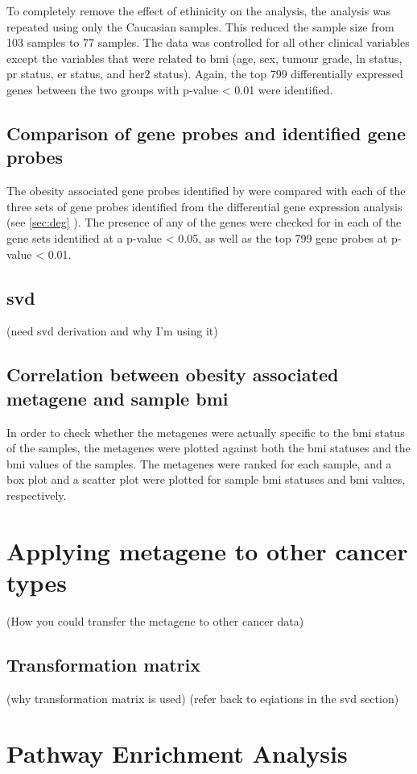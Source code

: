 To completely remove the effect of ethinicity on the analysis, the analysis was repeated using only the Caucasian samples.
This reduced the sample size from 103 samples to 77 samples.
The data was controlled for all other clinical variables except the variables that were related to \gls{bmi} (age, sex, tumour grade, \gls{ln} status, \gls{pr} status, \gls{er} status, and \gls{her2} status).
Again, the top 799 differentially expressed genes between the two groups with p-value \textless{} 0.01 were identified.

\subsection{Comparison of \citet{Creighton2012} gene probes and identified gene probes}
\label{subsec:cfgeneprobes}

The obesity associated gene probes identified by \citet{Creighton2012} were compared with each of the three sets of gene probes identified from the differential gene expression analysis (see \cref{sec:deg} ).
The presence of any of the \citet{Creighton2012} genes were checked for in each of the gene sets identified at a p-value \textless{} 0.05, as well as the top 799 gene probes at p-value \textless{} 0.01.

\subsection{\gls{svd}}
\label{subsec:svd}

(need svd derivation and why I'm using it)

\subsection{Correlation between obesity associated metagene and sample \gls{bmi}}
\label{subsec:metavsbmi}

In order to check whether the metagenes were actually specific to the \gls{bmi} status of the samples, the metagenes were plotted against both the \gls{bmi} statuses and the \gls{bmi} values of the samples.
The metagenes were ranked for each sample, and a box plot and a scatter plot were plotted for sample \gls{bmi} statuses and \gls{bmi} values, respectively.

\section{Applying metagene to other cancer types}
\label{sec:metagene}

(How you could transfer the metagene to other cancer data)

\subsection{Transformation matrix}
\label{subsec:transmat}

(why transformation matrix is used)
(refer back to eqiations in the  svd section)

\section{Pathway Enrichment Analysis}
\label{sec:pathenrich}







